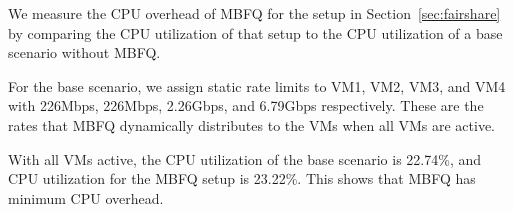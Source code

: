 We measure the CPU overhead of MBFQ for the setup in Section~\ref{sec:fairshare}
by comparing the CPU utilization of that setup to the CPU utilization of a base scenario
without MBFQ.  

For the base scenario, we assign static rate limits to VM1, VM2, VM3, and VM4 with 
226Mbps, 226Mbps, 2.26Gbps, 
and 6.79Gbps respectively.  These are the rates that MBFQ dynamically distributes  to
the VMs when all VMs are active.

With all VMs active, the CPU utilization of the base scenario is 22.74\%, and CPU utilization
for the MBFQ setup is 23.22\%. This shows that MBFQ has minimum CPU overhead.
